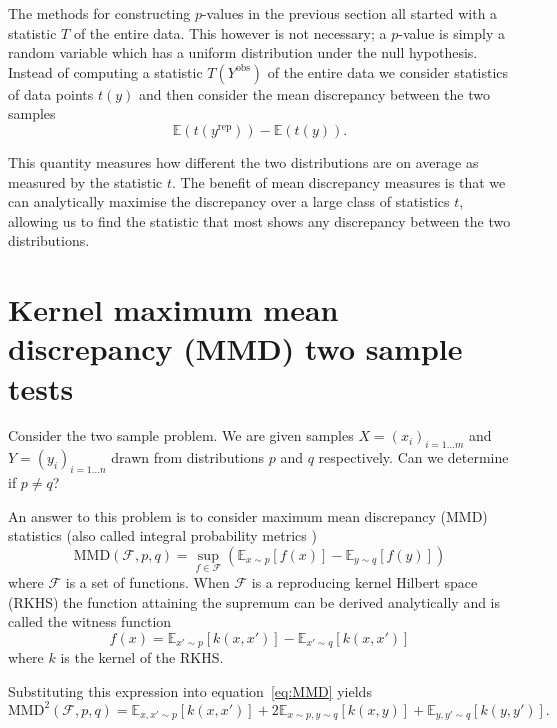 \documentclass{article} %
\begin{document}
The methods for constructing $p$-values in the previous section all started with a statistic $T$ of the entire data.
This however is not necessary; a $p$-value is simply a random variable which has a uniform distribution under the null hypothesis.
Instead of computing a statistic $T(Y^\textrm{obs})$ of the entire data we consider statistics of data points $t(y)$ and then consider the mean discrepancy between the two samples
\begin{equation}
\mathbb{E}(t(y^\textrm{rep})) - \mathbb{E}(t(y)).
\end{equation}

This quantity measures how different the two distributions are on average as measured by the statistic $t$.
The benefit of mean discrepancy measures is that we can analytically maximise the discrepancy over a large class of statistics $t$, allowing us to find the statistic that most shows any discrepancy between the two distributions.

\section{Kernel maximum mean discrepancy (MMD) two sample tests}

Consider the two sample problem. We are given samples ${X = (x_i)_{i=1\ldots m}}$ and ${Y = (y_i)_{i=1\ldots n}}$ drawn \iid from distributions $p$ and $q$ respectively.
Can we determine if $p \neq q$?

An answer to this problem is to consider maximum mean discrepancy (MMD) \citep{Gretton2008-ik} statistics (also called integral probability metrics \citep{Muller1997-vs})
\begin{equation}
\textrm{MMD}(\mathcal{F},p,q) = \sup_{f \in \mathcal{F}}(\mathbb{E}_{x\sim p}[f(x)] - \mathbb{E}_{y\sim q}[f(y)])
\label{eq:MMD}
\end{equation}
where $\mathcal{F}$ is a set of functions.
When $\mathcal{F}$ is a reproducing kernel Hilbert space (RKHS) the function attaining the supremum can be derived analytically and is called the witness function
\begin{equation}
f(x) = \mathbb{E}_{x'\sim p}[k(x,x')] - \mathbb{E}_{x'\sim q}[k(x,x')]
\label{eq:witness}
\end{equation}
where $k$ is the kernel of the RKHS.

Substituting this expression into equation~\eqref{eq:MMD} yields
\begin{equation}
  \textrm{MMD}^2(\mathcal{F},p,q) = \mathbb{E}_{x,x'\sim p}[k(x,x')] + 2\mathbb{E}_{x\sim p,y\sim q}[k(x,y)] + \mathbb{E}_{y,y'\sim q}[k(y,y')].
\end{equation}
\end{document}
